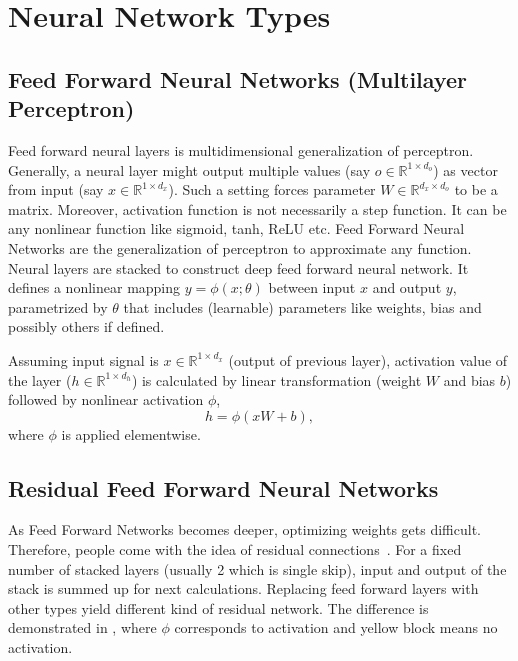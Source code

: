 \section{Neural Network Types}
\label{sec:nnet_types}

\subsection{Feed Forward Neural Networks (Multilayer Perceptron)}

Feed forward neural layers is multidimensional generalization of perceptron. 
Generally, a neural layer might output multiple values (say $o \in \mathbb{R}^{1 \times d_o}$) as vector from input (say $x \in \mathbb{R}^{1 \times d_x}$). 
Such a setting forces parameter $W \in \mathbb{R}^{d_x \times d_o} $ to be a matrix. 
Moreover, activation function is not necessarily a step function. 
It can be any nonlinear function like sigmoid, tanh, ReLU etc. 
Feed Forward Neural Networks are the generalization of perceptron to approximate any function. 
Neural layers are stacked to construct deep feed forward neural network. 
It defines a nonlinear mapping $y=\phi(x;\theta)$ between input $x$ and output $y$, parametrized by $\theta$ that includes (learnable) parameters like weights, bias and possibly others if defined.

Assuming input signal is $x \in \mathbb{R}^{1 \times d_x}$ (output of previous layer), 
activation value of the layer ($h \in \mathbb{R}^{1 \times d_h}$) is calculated by linear transformation (weight $W$ and bias $b$) followed by nonlinear activation $\phi$, 
\begin{equation}
\label{eqn:mlpact}
h = \phi(x W + b),
\end{equation}
where $\phi$ is applied elementwise.

\subsection{Residual Feed Forward Neural Networks}

As Feed Forward Networks becomes deeper, optimizing weights gets difficult. 
Therefore, people come with the idea of residual connections~\cite{he_deep_2015}. 
For a fixed number of stacked layers (usually 2 which is single skip), input and output of the stack is summed up for next calculations. 
Replacing feed forward layers with other types yield different kind of residual network. 
The difference is demonstrated in , where $\phi$ corresponds to activation and yellow block means no activation. 

